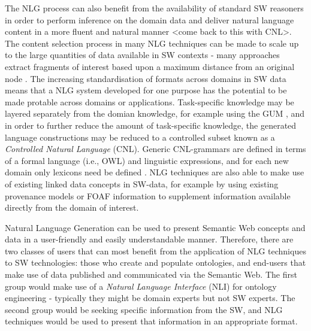 \documentclass{acm_proc_article-sp}
\begin{document}
The NLG process can also benefit from the availability of standard SW reasoners in order to perform inference on the domain data and deliver natural language content in a more fluent and natural manner <come back to this with CNL>.
The content selection process in many NLG techniques can be made to scale up to the large quantities of data available in SW contexts - many approaches extract fragments of interest based upon a maximum distance from an original node \cite{35}. The increasing standardisation of formats across domains in SW data means that a NLG system developed for one purpose has the potential to be made protable across domains or applications. Task-specific knowledge may be layered separately from the domian knowledge, for example using the GUM \cite{10}, and in order to further reduce the amount of task-specific knowledge, the generated language constructions may be reduced to a controlled subset known as a \textit{Controlled Natural Language} (CNL). Generic CNL-grammars are defined in terms of a formal language (i.e., OWL) and linguistic expressions, and for each new domain only lexicons need be defined \cite{105}. NLG techniques are also able to make use of existing linked data concepts in SW-data, for example by using existing provenance models or FOAF information to supplement information available directly from the domain of interest.

Natural Language Generation can be used to present Semantic Web concepts and data in a user-friendly and easily understandable manner. Therefore, there are two classes of users that can most benefit from the application of NLG techniques to SW technologies: those who create and populate ontologies, and end-users that make use of data published and communicated via the Semantic Web. The first group would make use of a \textit{Natural Language Interface} (NLI) for ontology engineering - typically they might be domain experts but not SW experts. The second group would be seeking specific information from the SW, and NLG techniques would be used to present that information in an appropriate format.
\end{document}
